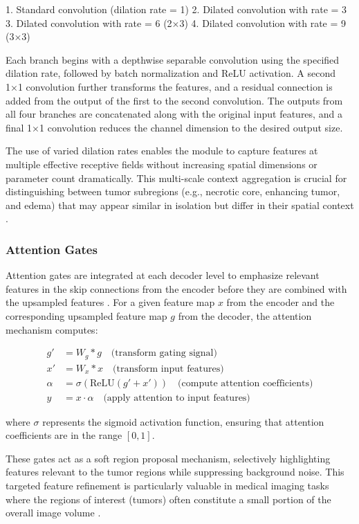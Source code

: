 \documentclass[12pt,a4paper]{article}
\begin{document}
1. Standard convolution (dilation rate = 1)
2. Dilated convolution with rate = 3
3. Dilated convolution with rate = 6 (2×3)
4. Dilated convolution with rate = 9 (3×3)

Each branch begins with a depthwise separable convolution using the specified dilation rate, followed by batch normalization and ReLU activation. A second 1×1 convolution further transforms the features, and a residual connection is added from the output of the first to the second convolution. The outputs from all four branches are concatenated along with the original input features, and a final 1×1 convolution reduces the channel dimension to the desired output size.

The use of varied dilation rates enables the module to capture features at multiple effective receptive fields without increasing spatial dimensions or parameter count dramatically. This multi-scale context aggregation is crucial for distinguishing between tumor subregions (e.g., necrotic core, enhancing tumor, and edema) that may appear similar in isolation but differ in their spatial context \cite{Chen2018ASPP}.

\subsubsection{Attention Gates}

Attention gates are integrated at each decoder level to emphasize relevant features in the skip connections from the encoder before they are combined with the upsampled features \cite{Rehman2023RAAGR2, Oktay2018AttentionUNet}. For a given feature map $x$ from the encoder and the corresponding upsampled feature map $g$ from the decoder, the attention mechanism computes:

\begin{align}
g' &= W_g * g \quad \textrm{(transform gating signal)} \\
x' &= W_x * x \quad \textrm{(transform input features)} \\
\alpha &= \sigma(\textrm{ReLU}(g' + x')) \quad \textrm{(compute attention coefficients)} \\
y &= x \cdot \alpha \quad \textrm{(apply attention to input features)}
\end{align}

where $\sigma$ represents the sigmoid activation function, ensuring that attention coefficients are in the range $[0,1]$.

These gates act as a soft region proposal mechanism, selectively highlighting features relevant to the tumor regions while suppressing background noise. This targeted feature refinement is particularly valuable in medical imaging tasks where the regions of interest (tumors) often constitute a small portion of the overall image volume \cite{Oktay2018AttentionUNet}.
\end{document}
